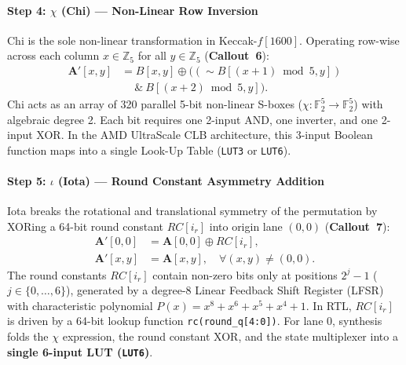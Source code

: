 \paragraph{Step 4: $\chi$ (Chi) --- Non-Linear Row Inversion}
Chi is the sole non-linear transformation in Keccak-$f[1600]$. Operating row-wise across each column $x \in \mathbb{Z}_5$ for all $y \in \mathbb{Z}_5$ (\textbf{Callout~6}):
\begin{equation}
\begin{aligned}
\mathbf{A}'[x, y] &= B[x, y] \oplus ((\sim B[(x+1) \bmod 5, y]) \\
                  &\quad \ \& \ B[(x+2) \bmod 5, y]).
\end{aligned}
\label{eq:chi_step}
\end{equation}
Chi acts as an array of 320 parallel 5-bit non-linear S-boxes ($\chi: \mathbb{F}_2^5 \to \mathbb{F}_2^5$) with algebraic degree 2. Each bit requires one 2-input AND, one inverter, and one 2-input XOR. In the AMD UltraScale CLB architecture, this 3-input Boolean function maps into a single Look-Up Table (\texttt{LUT3} or \texttt{LUT6}).

\paragraph{Step 5: $\iota$ (Iota) --- Round Constant Asymmetry Addition}
Iota breaks the rotational and translational symmetry of the permutation by XORing a 64-bit round constant $RC[i_r]$ into origin lane $(0, 0)$ (\textbf{Callout~7}):
\begin{align}
\mathbf{A}'[0, 0] &= \mathbf{A}[0, 0] \oplus RC[i_r], \label{eq:iota_step} \\
\mathbf{A}'[x, y] &= \mathbf{A}[x, y], \quad \forall (x, y) \neq (0, 0). \nonumber
\end{align}
The round constants $RC[i_r]$ contain non-zero bits only at positions $2^j - 1$ ($j \in \{0, \dots, 6\}$), generated by a degree-8 Linear Feedback Shift Register (\mbox{LFSR}) with characteristic polynomial $P(x) = x^8 + x^6 + x^5 + x^4 + 1$. In RTL, $RC[i_r]$ is driven by a 64-bit lookup function \texttt{rc(round\_q[4:0])}. For lane 0, synthesis folds the $\chi$ expression, the round constant XOR, and the state multiplexer into a \textbf{single 6-input LUT (\texttt{LUT6})}.

